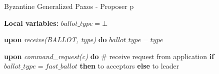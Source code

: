\begin{algorithm}[!t] 
	\caption{Byzantine Generalized Paxos - Proposer p}
	\label{BFT-Prop}
	\textbf{Local variables:} $ballot\_type = \bot$
	\begin{algorithmic}[1]
			
		\State \textbf{upon} \textit{receive(BALLOT, type)} \textbf{do} 
		\State \hspace{\algorithmicindent} $ballot\_type = type$
		\State
		
		\State \textbf{upon} \textit{command\_request(c)} \textbf{do}   \hspace{\algorithmicindent}\hspace{\algorithmicindent}\hspace{\algorithmicindent}\hspace{\algorithmicindent}\# receive request from application
		\State \hspace{\algorithmicindent} \textbf{if} $ballot\_type = fast\_ballot$ \textbf{then}
		\State \hspace{\algorithmicindent}\hspace{\algorithmicindent}  to acceptors
		\State \hspace{\algorithmicindent} \textbf{else} 
		\State \hspace{\algorithmicindent}\hspace{\algorithmicindent}  to leader	
	\end{algorithmic}
\end{algorithm}


